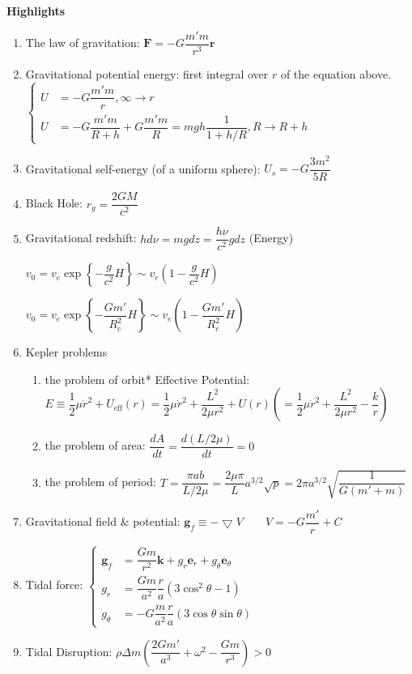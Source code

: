 \documentclass[11pt, a4paper, oneside]{book}
\numberwithin{equation}{section}%
\begin{document}
\textbf{Highlights}
\begin{enumerate}
	\item The law of gravitation: $\bm{F} = -G\dfrac{m'm}{r^3}\bm{r}$
	\item Gravitational potential energy: first integral over $ r $ of the equation above.\\
	$\left\{\begin{aligned}
	 U &= -G\dfrac{m'm}{r}, \infty \rightarrow r\\
	 U &= -G\dfrac{m'm}{R+h} + G\dfrac{m'm}{R} = mgh\dfrac{1}{1 + h/R}, R \rightarrow R + h
	\end{aligned}\right.$
	\item Gravitational self-energy (of a uniform sphere):
	$U_s = -G\dfrac{3m^2}{5R}$
	\item Black Hole: $r_g = \dfrac{2GM}{c^2}$
	\item Gravitational redshift:
	$ hd\nu = mgdz = \dfrac{h\nu}{c^2}gdz $ (Energy)
	
	$v_0 = v_e \exp\left\{-\dfrac{g}{c^2}H\right\} \sim v_e\left(1 - \dfrac{g}{c^2}H\right)$
	
	$v_0 = v_e \exp\left\{-\dfrac{Gm'}{R_c^2}H\right\} \sim v_e\left(1 - \dfrac{Gm'}{R_c^2}H\right)$
	\item Kepler problems
	\begin{enumerate}
		\item the problem of orbit*
			\subitem Effective Potential: $E \equiv \dfrac{1}{2}\mu \dot{r}^2 + U_{\text{eff}}(r) = \dfrac{1}{2}\mu \dot{r}^2 + \dfrac{L^2}{2\mu r^2} + U(r) \left(= \dfrac{1}{2}\mu \dot{r}^2 + \dfrac{L^2}{2\mu r^2} - \dfrac{k}{r}\right)$
		\item the problem of area: $\dfrac{dA}{dt} = \dfrac{d(L/2\mu)}{dt} = 0$
		\item the problem of period: $T = \dfrac{\pi ab}{L/2\mu} = \dfrac{2\mu\pi}{L}a^{3/2}\sqrt{p} = 2\pi a^{3/2}\sqrt{\dfrac{1}{G(m' + m)}} $
	\end{enumerate}
	\item Gravitational field \& potential: $\bm{g}_f \equiv -\bigtriangledown V$~~~~$V = -G\dfrac{m'}{r} + C$
	\item Tidal force: 
	$\left\{\begin{aligned}
	\bm{g}_f &= \dfrac{Gm}{r^2}\bm{k} + g_r\bm{e}_r + g_\theta\bm{e}_\theta\\
	g_r &= \dfrac{Gm}{a^2}\dfrac{r}{a}(3\cos^2\theta - 1)\\
	g_\theta &= -G\dfrac{m}{a^2}\dfrac{r}{a}(3\cos\theta\sin\theta)	 
	\end{aligned}\right.$
	\item Tidal Disruption: $ \rho\Delta m \left(\dfrac{2Gm'}{a^3} + \omega^2 - \dfrac{Gm}{r^3}\right) > 0 $

\end{enumerate}
\end{document}
